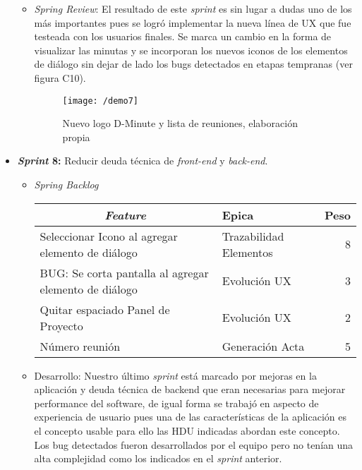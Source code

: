\begin{itemize}
\begin{itemize}
\item \textit{Spring Review}: El resultado de este \textit{sprint} es sin lugar a dudas uno de los más importantes pues se logró implementar la nueva línea de UX que fue testeada con los usuarios finales. Se marca un cambio en la forma de visualizar las minutas y se incorporan los nuevos iconos de los elementos de diálogo sin dejar de lado los bugs detectados en etapas tempranas (ver figura C10).

\begin{figure}[!h]
\centering
\texttt{[image: /demo7]}
\label{imga-c7}
\caption{Nuevo logo D-Minute y lista de reuniones, elaboración propia}
\end{figure}

\end{itemize}	


	\item \textbf{\textit{Sprint} 8:} Reducir deuda técnica de \textit{front-end} y \textit{back-end}. 

\begin{itemize}
\item \textit{Spring Backlog}

\begin{table}[!h]
\centering
\label{tab:backlog8}
\begin{tabular}{|l|l|r|}
\hline
\multicolumn{1}{|c|}{\textit{\textbf{Feature}}} & \textbf{Epica} & \textbf{Peso} \\ \hline
Seleccionar Icono al agregar elemento de diálogo & Trazabilidad Elementos & 8 \\ \hline
BUG: Se corta pantalla al agregar elemento de diálogo & Evolución UX & 3 \\ \hline
Quitar espaciado Panel de Proyecto & Evolución UX & 2 \\ \hline
Número reunión & Generación Acta & 5 \\ \hline
\end{tabular}
\end{table}



\item Desarrollo: Nuestro último \textit{sprint} está marcado por mejoras en la aplicación y deuda técnica de backend que eran necesarias para mejorar performance del software, de igual forma se trabajó en aspecto de experiencia de usuario pues una de las características de la aplicación es el concepto usable para ello las HDU indicadas abordan este concepto. Los bug detectados fueron desarrollados por el equipo pero no tenían una alta complejidad como los indicados en el \textit{sprint} anterior.


\end{itemize}
\end{itemize}
